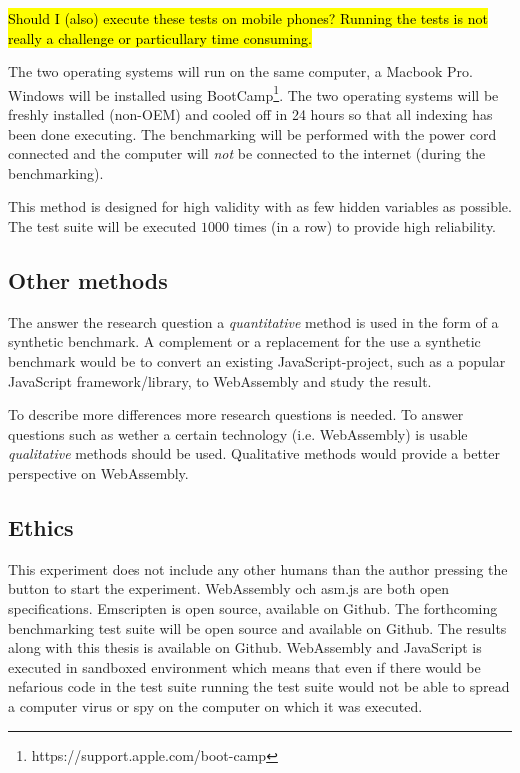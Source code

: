 \hl{Should I (also) execute these tests on mobile phones? Running the tests is not really a challenge or particullary time consuming.}

The two operating systems will run on the same computer, a Macbook Pro. Windows will be installed using BootCamp\footnote{https://support.apple.com/boot-camp}. The two operating systems will be freshly installed (non-OEM) and cooled off in 24 hours so that all indexing has been done executing. The benchmarking will be performed with the power cord connected and the computer will \emph{not} be connected to the internet (during the benchmarking).

This method is designed for high validity with as few hidden variables as possible. The test suite will be executed $1 000$ times (in a row) to provide high reliability.

\subsection*{Other methods}

The answer the research question a \emph{quantitative} method is used in the form of a synthetic benchmark. A complement or a replacement for the use a synthetic benchmark would be to convert an existing JavaScript-project, such as a popular JavaScript framework/library, to WebAssembly and study the result.

To describe more differences more research questions is needed. To answer questions such as wether a certain technology (i.e. WebAssembly) is usable \emph{qualitative} methods should be used. Qualitative methods would provide a better perspective on WebAssembly.

\subsection{Ethics}

This experiment does not include any other humans than the author pressing the button to start the experiment. WebAssembly och asm.js are both open specifications. Emscripten is open source, available on Github. The forthcoming benchmarking test suite will be open source and available on Github. The results along with this thesis is available on Github. WebAssembly and JavaScript is executed in sandboxed environment which means that even if there would be nefarious code in the test suite running the test suite would not be able to spread a computer virus or spy on the computer on which it was executed.
